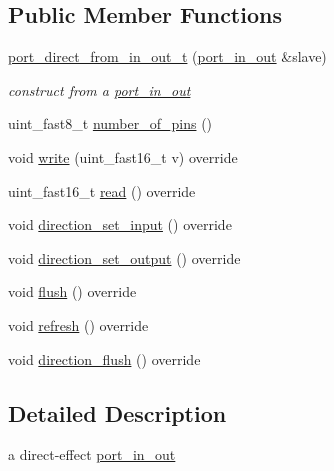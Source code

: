 \subsection*{Public Member Functions}
\begin{DoxyCompactItemize}
\item 
\mbox{\label{classhwlib_1_1port__direct__from__in__out__t_ad3f92f8cd9ae4d06204159708a39236a}} 
\hyperlink{classhwlib_1_1port__direct__from__in__out__t_ad3f92f8cd9ae4d06204159708a39236a}{port\+\_\+direct\+\_\+from\+\_\+in\+\_\+out\+\_\+t} (\hyperlink{classhwlib_1_1port__in__out}{port\+\_\+in\+\_\+out} \&slave)
\begin{DoxyCompactList}\small\item\em construct from a \hyperlink{classhwlib_1_1port__in__out}{port\+\_\+in\+\_\+out} \end{DoxyCompactList}\item 
uint\+\_\+fast8\+\_\+t \hyperlink{classhwlib_1_1port__direct__from__in__out__t_a7b9bed1806a7597e886404637d1fdf7e}{number\+\_\+of\+\_\+pins} ()
\item 
void \hyperlink{classhwlib_1_1port__direct__from__in__out__t_a952b994b4b4793590252781686468e48}{write} (uint\+\_\+fast16\+\_\+t v) override
\item 
uint\+\_\+fast16\+\_\+t \hyperlink{classhwlib_1_1port__direct__from__in__out__t_adfcd5d0e4d4d76a1e92a37fc8e007f0b}{read} () override
\item 
void \hyperlink{classhwlib_1_1port__direct__from__in__out__t_ad4aa8a6a665220be275597d7b00a306c}{direction\+\_\+set\+\_\+input} () override
\item 
void \hyperlink{classhwlib_1_1port__direct__from__in__out__t_a8702543e5a779026dd0b8602aaf5ae56}{direction\+\_\+set\+\_\+output} () override
\item 
void \hyperlink{classhwlib_1_1port__direct__from__in__out__t_a59745ee886092e4ff81906aafedbcfdd}{flush} () override
\item 
void \hyperlink{classhwlib_1_1port__direct__from__in__out__t_a4c609a465a6cd1996780001a04ae5bf4}{refresh} () override
\item 
void \hyperlink{classhwlib_1_1port__direct__from__in__out__t_a399d11ab7b3d583162c6bcaa584d2deb}{direction\+\_\+flush} () override
\end{DoxyCompactItemize}


\subsection{Detailed Description}
a direct-\/effect \hyperlink{classhwlib_1_1port__in__out}{port\+\_\+in\+\_\+out}

